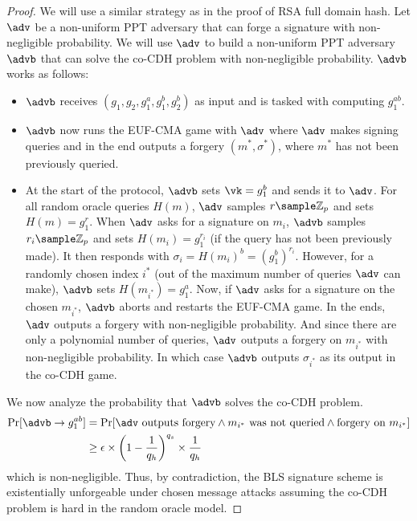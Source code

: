 \documentclass[12pt]{tufte-book}
\begin{document}
\begin{proof}
    We will use a similar strategy as in the proof of RSA full domain hash. Let $\adv$ be a non-uniform PPT adversary that can forge a signature with non-negligible probability. We will use $\adv$ to build a non-uniform PPT adversary $\advb$ that can solve the co-CDH problem with non-negligible probability.
    $\advb$ works as follows:
    \begin{itemize}
        \item $\advb$ receives $(g_1, g_2, g_1^a, g_1^b, g_2^b)$ as input and is tasked with computing $g_1^{ab}$.
        \item $\advb$ now runs the EUF-CMA game with $\adv$ where $\adv$ makes signing queries and in the end outputs a forgery $(m^*, \sigma^*)$, where $m^*$ has not been previously queried.
        \item At the start of the protocol, $\advb$ sets $\vk = g_1^b$ and sends it to $\adv$. For all random oracle queries $H(m)$, $\adv$ samples $r \sample \mathbb{Z}_p$ and sets $H(m) = g_1^r$. When $\adv$ asks for a signature on $m_i$, $\advb$ samples $r_i \sample \mathbb{Z}_p$ and sets $H(m_i) = g_1^{r_i}$ (if the query has not been previously made). It then responds with $\sigma_i = H(m_i)^b = (g_1^b)^{r_i}$. However, for a randomly chosen index $i^*$ (out of the maximum number of queries $\adv$ can make), $\advb$ sets $H(m_{i^*}) = g_1^a$. Now, if $\adv$ asks for a signature on the chosen $m_{i^*}$, $\advb$ aborts and restarts the EUF-CMA game. In the ends, $\adv$ outputs a forgery with non-negligible probability. And since there are only a polynomial number of queries, $\adv$ outputs a forgery on $m_{i^*}$ with non-negligible probability. In which case $\advb$ outputs $\sigma_{i^*}$ as its output in the co-CDH game.
    \end{itemize}

    We now analyze the probability that $\advb$ solves the co-CDH problem.
    \begin{align*}
        \Pr[\advb \to g_1^{ab}] & = \Pr[\adv \text{ outputs forgery} \wedge m_{i^*} \text{ was not queried} \wedge \text{forgery on } m_{i^*}] \\
                                & \geq \epsilon \times \left( 1 -\frac{1}{q_h}\right)^{q_s} \times \frac{1}{q_h}
    \end{align*}
    which is non-negligible.
    Thus, by contradiction, the BLS signature scheme is existentially unforgeable under chosen message attacks assuming the co-CDH problem is hard in the random oracle model.
\end{proof}
\end{document}
